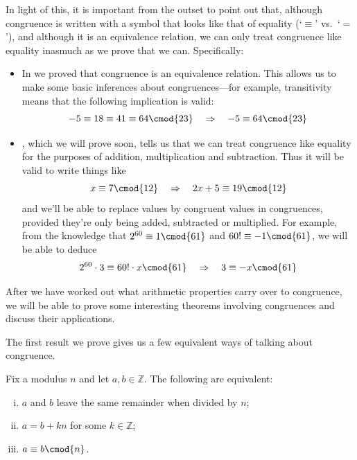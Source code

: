 In light of this, it is important from the outset to point out that, although congruence is written with a symbol that looks like that of equality (`$\equiv$' vs.\ `$=$'), and although it is an equivalence relation, we can only treat congruence like equality inasmuch as we prove that we can. Specifically:
\begin{itemize}
\item In  we proved that congruence is an equivalence relation. This allows us to make some basic inferences about congruences---for example, transitivity means that the following implication is valid:
\[ -5 \equiv 18 \equiv 41 \equiv 64 \cmod{23} \quad \Rightarrow \quad -5 \equiv 64 \cmod{23} \]
\item {}, which we will prove soon, tells us that we can treat congruence like equality for the purposes of addition, multiplication and subtraction. Thus it will be valid to write things like
\[ x \equiv 7 \cmod{12} \quad \Rightarrow \quad 2x+5 \equiv 19 \cmod{12} \]
and we'll be able to replace values by congruent values in congruences, provided they're only being added, subtracted or multiplied. For example, from the knowledge that $2^{60} \equiv 1 \cmod{61}$ and $60! \equiv -1 \cmod{61}$, we will be able to deduce
\[ 2^{60} \cdot 3 \equiv 60! \cdot x \cmod{61} \quad \Rightarrow \quad 3 \equiv -x \cmod{61} \]
\end{itemize}

After we have worked out what arithmetic properties carry over to congruence, we will be able to prove some interesting theorems involving congruences and discuss their applications.

The first result we prove gives us a few equivalent ways of talking about congruence.

\begin{proposition}
\label{propModAsDivDiff}
Fix a modulus $n$ and let $a,b \in \mathbb{Z}$. The following are equivalent:
\begin{enumerate}[(i)]
\item $a$ and $b$ leave the same remainder when divided by $n$;
\item $a=b+kn$ for some $k \in \mathbb{Z}$;
\item $a \equiv b \cmod{n}$.
\end{enumerate}
\end{proposition}

